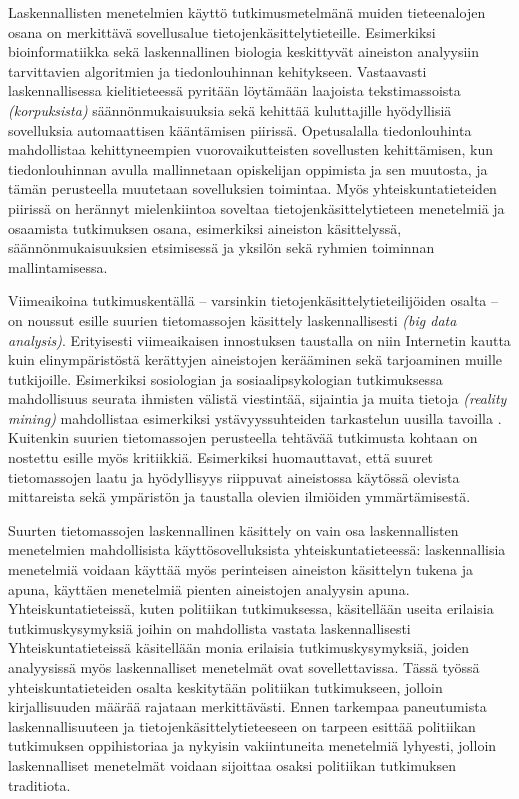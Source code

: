 \documentclass[finnish,gradu,twoside,12pt]{tktltiki}
\begin{document}
Laskennallisten menetelmien käyttö tutkimusmetelmänä muiden tieteenalojen osana on merkittävä sovellusalue tietojenkäsittelytieteille. Esimerkiksi bioinformatiikka sekä laskennallinen biologia keskittyvät aineiston analyysiin tarvittavien algoritmien ja tiedonlouhinnan kehitykseen. Vastaavasti laskennallisessa kielitieteessä pyritään löytämään laajoista tekstimassoista \textit{(korpuksista)} säännönmukaisuuksia sekä kehittää kuluttajille hyödyllisiä sovelluksia automaattisen kääntämisen piirissä. Opetusalalla tiedonlouhinta mahdollistaa kehittyneempien vuorovaikutteisten sovellusten kehittämisen, kun tiedonlouhinnan avulla mallinnetaan opiskelijan oppimista ja sen muutosta, ja tämän perusteella muutetaan sovelluksien toimintaa. Myös yhteiskuntatieteiden piirissä on herännyt mielenkiintoa soveltaa tietojenkäsittelytieteen menetelmiä ja osaamista tutkimuksen osana, esimerkiksi aineiston käsittelyssä, säännönmukaisuuksien etsimisessä ja yksilön sekä ryhmien toiminnan mallintamisessa.

Viimeaikoina tutkimuskentällä -- varsinkin tietojenkäsittelytieteilijöiden osalta -- on noussut esille suurien tietomassojen käsittely laskennallisesti \textit{(big data analysis)}. Erityisesti viimeaikaisen innostuksen taustalla on niin Internetin kautta \citep{adamic05,notess02} kuin elinympäristöstä kerättyjen aineistojen \citep{eagle06,oulasvirta12} kerääminen sekä tarjoaminen muille tutkijoille. Esimerkiksi sosiologian ja sosiaalipsykologian tutkimuksessa mahdollisuus seurata ihmisten välistä viestintää, sijaintia ja muita tietoja \textit{(reality mining)} mahdollistaa esimerkiksi ystävyyssuhteiden tarkastelun uusilla tavoilla \cite{Karikoski2011a,Nelimarkka2012}. Kuitenkin suurien tietomassojen perusteella tehtävää tutkimusta kohtaan on nostettu esille myös kritiikkiä. Esimerkiksi \citet{Boyd2012a} huomauttavat, että suuret tietomassojen laatu ja hyödyllisyys riippuvat aineistossa käytössä olevista mittareista sekä ympäristön ja taustalla olevien ilmiöiden ymmärtämisestä.

Suurten tietomassojen laskennallinen käsittely on vain osa laskennallisten menetelmien mahdollisista käyttösovelluksista yhteiskuntatieteessä: laskennallisia menetelmiä voidaan käyttää myös perinteisen aineiston käsittelyn tukena ja apuna, käyttäen menetelmiä pienten aineistojen analyysin apuna. Yhteiskuntatieteissä, kuten politiikan tutkimuksessa, käsitellään useita erilaisia tutkimuskysymyksiä joihin on mahdollista vastata laskennallisesti Yhteiskuntatieteissä käsitellään monia erilaisia tutkimuskysymyksiä, joiden analyysissä myös laskennalliset menetelmät ovat sovellettavissa. Tässä työssä yhteiskuntatieteiden osalta keskitytään politiikan tutkimukseen, jolloin kirjallisuuden määrää rajataan merkittävästi. Ennen tarkempaa paneutumista laskennallisuuteen ja tietojenkäsittelytieteeseen on tarpeen esittää politiikan tutkimuksen oppihistoriaa ja nykyisin vakiintuneita menetelmiä lyhyesti, jolloin laskennalliset menetelmät voidaan sijoittaa osaksi politiikan tutkimuksen traditiota.
\end{document}
